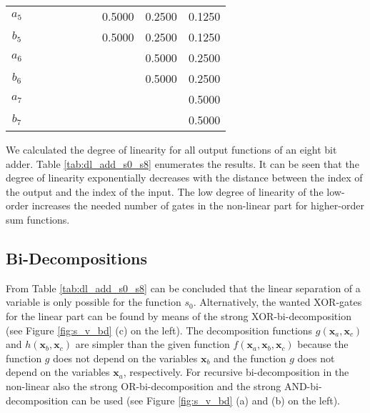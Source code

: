 \documentclass[12pt]{toptesi}
\newcommand\bx{\mathbf{x}}
\begin{document}
\begin{table}
\begin{tabular}{cccccccccc}
$a_5$	&         &        &        &        &        &        & 0.5000 & 0.2500 & 0.1250 \\	
$b_5$	&         &        &        &        &        &        & 0.5000 & 0.2500 & 0.1250 \\	
$a_6$	&         &        &        &        &        &        &        & 0.5000 & 0.2500 \\	
$b_6$	&         &        &        &        &        &        &        & 0.5000 & 0.2500 \\	
$a_7$	&         &        &        &        &        &        &        &        & 0.5000 \\	
$b_7$	&         &        &        &        &        &        &        &        & 0.5000 \\	
\bottomrule
		\end{tabular}
\end{table}

We calculated the degree of linearity for all output functions of an eight bit adder. Table \ref{tab:dl_add_s0_s8} enumerates the results. It can be seen that the degree of linearity exponentially decreases with the distance between the index of the output and the index of the input. The low degree of linearity of the low-order increases the needed number of gates in the non-linear part for higher-order sum functions.

\subsection{Bi-Decompositions}

From Table \ref{tab:dl_add_s0_s8} can be concluded that the linear separation of a variable is only possible for the function $s_0$.
Alternatively, the wanted XOR-gates for the linear part can be found by means of the strong XOR-bi-decomposition (see Figure \ref{fig:s_v_bd} (c) on the left). The decomposition functions $g(\bx_a,\bx_c)$ and $h(\bx_b,\bx_c)$ are simpler than the given function $f(\bx_a,\bx_b,\bx_c)$ because the function $g$ does not depend on the variables $\bx_b$ and the function $g$ does not depend on the variables $\bx_a$, respectively. For recursive bi-decomposition in the non-linear also the strong OR-bi-decomposition and the strong AND-bi-decomposition can be used (see Figure \ref{fig:s_v_bd} (a) and (b) on the left).
\end{document}
